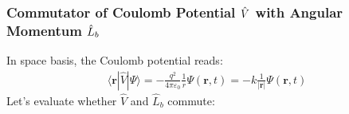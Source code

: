 \documentclass[letterpaper,10pt,english]{jupyterBook}
\begin{document}
\subsubsection{Commutator of Coulomb Potential \protect\(\hat{V}\protect\) with Angular Momentum \protect\(\hat{L}_b\protect\)}
\label{\detokenize{ch/quantum-mechanics/atom-models/schrodinger-notes:commutator-of-coulomb-potential-hat-v-with-angular-momentum-hat-l-b}}\label{\detokenize{ch/quantum-mechanics/atom-models/schrodinger-notes:quantum-mechanics-atom-models-schrodinger-notes-commutation-l-v}}
\sphinxAtStartPar
In space basis, the Coulomb potential reads:
\begin{equation*}
\begin{split}\langle \mathbf{r} | \hat{V} | \Psi \rangle = -\frac{q^2}{4\pi\varepsilon_0} \frac{1}{r} \Psi(\mathbf{r}, t) = -k \frac{1}{|\mathbf{r}|} \Psi(\mathbf{r}, t)\end{split}
\end{equation*}
\sphinxAtStartPar
Let’s evaluate whether \(\hat{V}\) and \(\hat{L}_b\) commute:
\end{document}
